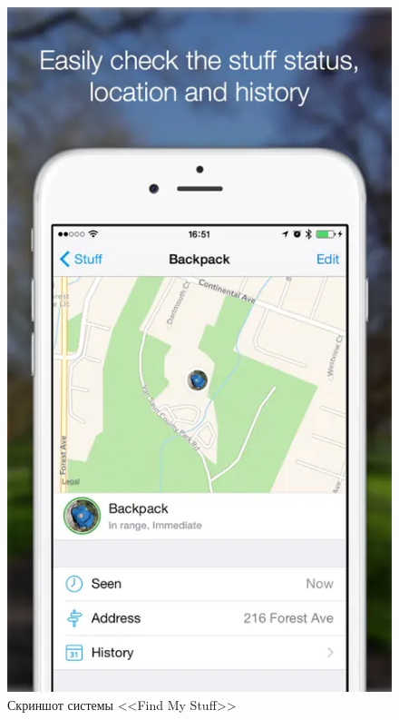 \begin{figure}[htb]
	\centering
	\includegraphics[height=.4\textheight]{images/findMyStuff1.png}
	\parskip=6pt
	\caption{Скриншот системы <<Find My Stuff>>}
	\label{fig:findMyStuff1}
\end{figure}

